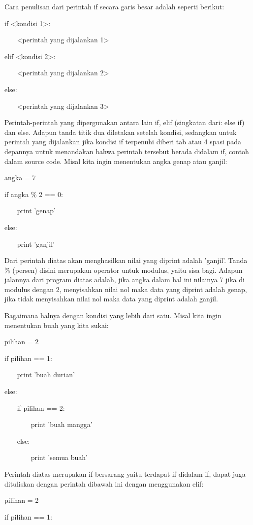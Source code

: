  
Cara penulisan dari perintah if secara garis besar adalah seperti berikut: 
 
if <kondisi 1>: 

 
~~~ <perintah yang dijalankan 1> 

 
elif <kondisi 2>: 

 
~~~ <perintah yang dijalankan 2> 

 
else: 

 
~~~ <perintah yang dijalankan 3> 

 
Perintah-perintah yang dipergunakan antara lain   if,   elif   (singkatan dari:   else if) dan   else. Adapun tanda titik dua diletakan setelah kondisi, sedangkan untuk perintah yang dijalankan jika kondisi if terpenuhi diberi   tab   atau   4 spasi   pada depannya untuk menandakan bahwa perintah tersebut berada didalam if, contoh dalam source code. Misal kita ingin menentukan angka genap atau ganjil: 

 
angka = 7 

 
if angka    \%   2 == 0: 

 
~~~ print 'genap' 

 
else: 

 
~~~ print 'ganjil' 

 
Dari perintah diatas akan menghasilkan nilai yang diprint adalah 'ganjil'. Tanda      \%     (persen) disini merupakan operator untuk modulus, yaitu sisa bagi. Adapun jalannya dari program diatas adalah, jika angka dalam hal ini nilainya 7 jika di modulus dengan 2, menyisahkan nilai nol maka data yang diprint adalah genap, jika tidak menyisahkan nilai nol maka data yang diprint adalah ganjil. 

 
Bagaimana halnya dengan kondisi yang lebih dari satu. Misal kita ingin menentukan buah yang kita sukai: 

 
pilihan = 2 

 
if pilihan == 1: 

 
~~~ print 'buah durian' 

 
else: 

 
~~~ if pilihan == 2: 

 
~~~~~~~ print 'buah mangga' 

 
~~~ else: 

 
~~~~~~~ print 'semua buah' 

 
Perintah diatas merupakan if bersarang yaitu terdapat if didalam if, dapat juga dituliskan dengan perintah dibawah ini dengan menggunakan   elif: 

 
pilihan = 2 

 
if pilihan == 1: 

